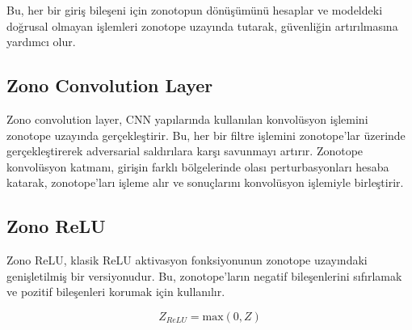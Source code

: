 Bu, her bir giriş bileşeni için zonotopun dönüşümünü hesaplar ve modeldeki doğrusal olmayan işlemleri zonotope uzayında tutarak, güvenliğin artırılmasına yardımcı olur.

\subsection{Zono Convolution Layer}

Zono convolution layer, CNN yapılarında kullanılan konvolüsyon işlemini zonotope uzayında gerçekleştirir. Bu, her bir filtre işlemini zonotope'lar üzerinde gerçekleştirerek adversarial saldırılara karşı savunmayı artırır. Zonotope konvolüsyon katmanı, girişin farklı bölgelerinde olası perturbasyonları hesaba katarak, zonotope'ları işleme alır ve sonuçlarını konvolüsyon işlemiyle birleştirir.

\subsection{Zono ReLU}

Zono ReLU, klasik ReLU aktivasyon fonksiyonunun zonotope uzayındaki genişletilmiş bir versiyonudur. Bu, zonotope'ların negatif bileşenlerini sıfırlamak ve pozitif bileşenleri korumak için kullanılır.

\[ Z_{ReLU} = \text{max}(0, Z) \]

\newpage